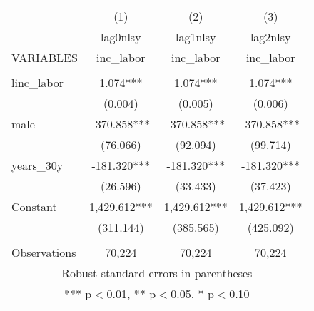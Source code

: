\begin{tabular}{lccc} \hline
 & (1) & (2) & (3) \\
 & lag0nlsy & lag1nlsy & lag2nlsy \\
VARIABLES & inc\_labor & inc\_labor & inc\_labor \\ \hline
 &  &  &  \\
linc\_labor & 1.074*** & 1.074*** & 1.074*** \\
 & (0.004) & (0.005) & (0.006) \\
male & -370.858*** & -370.858*** & -370.858*** \\
 & (76.066) & (92.094) & (99.714) \\
years\_30y & -181.320*** & -181.320*** & -181.320*** \\
 & (26.596) & (33.433) & (37.423) \\
Constant & 1,429.612*** & 1,429.612*** & 1,429.612*** \\
 & (311.144) & (385.565) & (425.092) \\
 &  &  &  \\
 Observations & 70,224 & 70,224 & 70,224 \\ \hline
\multicolumn{4}{c}{ Robust standard errors in parentheses} \\
\multicolumn{4}{c}{ *** p$<$0.01, ** p$<$0.05, * p$<$0.10} \\
\end{tabular}
